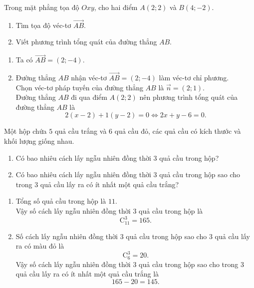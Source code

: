 \begin{bt}%
Trong mặt phẳng tọa độ $Oxy$, cho hai điểm $A(2;2)$ và $B(4;-2)$.
\begin{enumerate}
\item Tìm tọa độ véc-tơ $\overrightarrow{AB}$.
\item Viết phương trình tổng quát của đường thẳng $AB$.
\end{enumerate}
\loigiai
{
\begin{enumerate}
\item Ta có $\overrightarrow{AB}=(2;-4)$.
\item Đường thẳng $AB$ nhận véc-tơ $\overrightarrow{AB}=(2;-4)$ làm véc-tơ chỉ phương.\\
Chọn véc-tơ pháp tuyến của đường thẳng $AB$ là $\overrightarrow{n}=(2;1)$.\\
Đường thẳng $AB$ đi qua điểm $A(2;2)$ nên phương trình tổng quát của đường thẳng $AB$ là
$$2(x-2)+1(y-2)=0 \Leftrightarrow 2x+y-6=0.$$
\end{enumerate}
}
\end{bt}

\begin{bt}%
Một hộp chứa $5$ quả cầu trắng và $6$ quả cầu đỏ, các quả cầu có kích thước và khối lượng giống nhau.
\begin{enumerate}
\item Có bao nhiêu cách lấy ngẫu nhiên đồng thời $3$ quả cầu trong hộp?
\item Có bao nhiêu cách lấy ngẫu nhiên đồng thời $3$ quả cầu trong hộp sao cho trong $3$ quả cầu lấy ra có ít nhất một quả cầu trắng?
\end{enumerate}
\loigiai
{
\begin{enumerate}
\item Tổng số quả cầu trong hộp là $11$. \\
Vậy số cách lấy ngẫu nhiên đồng thời $3$ quả cầu trong hộp là
$$\mathrm{C}_{11}^3=165.$$
\item Số cách lấy ngẫu nhiên đồng thời $3$ quả cầu trong hộp sao cho $3$ quả cầu lấy ra có màu đỏ là
$$\mathrm{C}_{6}^{3}=20.$$
Vậy số cách lấy ngẫu nhiên đồng thời $3$ quả cầu trong hộp sao cho trong $3$ quả cầu lấy ra có ít nhất một quả cầu trắng là
$$165-20=145.$$
\end{enumerate}
}
\end{bt}

